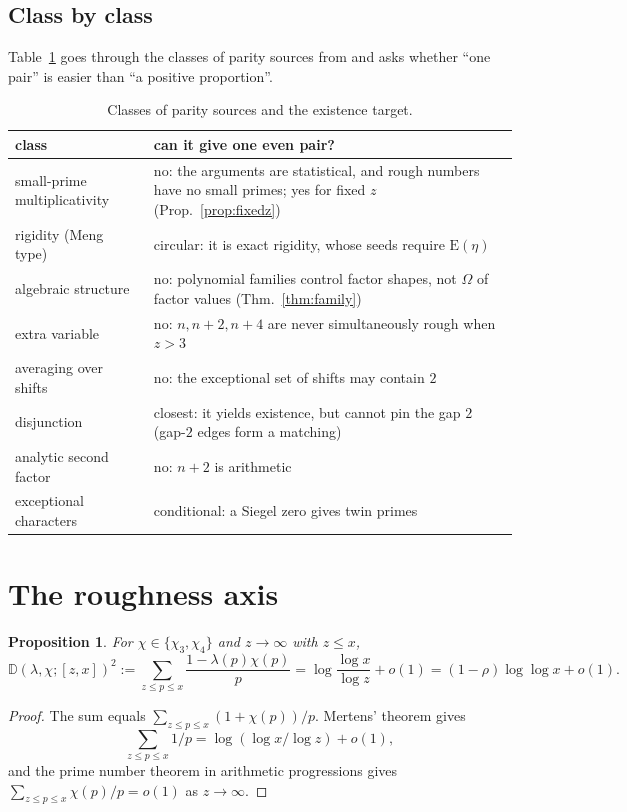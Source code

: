 \documentclass[11pt]{amsart}
\newtheorem{proposition}[theorem]{Proposition}
\theoremstyle{definition}
\theoremstyle{remark}
\newcommand{\D}{\mathbb{D}}
\newcommand{\EE}{\mathrm E}
\begin{document}
\subsection{Class by class}
Table~\ref{tab:classes} goes through the classes of parity sources from \cite{Wan26b} and asks whether ``one pair'' is easier than ``a positive proportion''.

\begin{table}[h]
\centering\small
\begin{tabular}{p{3.4cm}p{9.4cm}}
\toprule
class & can it give one even pair?\\
\midrule
small-prime multiplicativity & no: the arguments are statistical, and rough numbers have no small primes; yes for fixed $z$ (Prop.~\ref{prop:fixedz})\\
rigidity (Meng type) & circular: it is exact rigidity, whose seeds require $\EE(\eta)$\\
algebraic structure & no: polynomial families control factor shapes, not $\Omega$ of factor values (Thm.~\ref{thm:family})\\
extra variable & no: $n,n+2,n+4$ are never simultaneously rough when $z>3$\\
averaging over shifts & no: the exceptional set of shifts may contain $2$\\
disjunction & closest: it yields existence, but cannot pin the gap $2$ (gap-$2$ edges form a matching)\\
analytic second factor & no: $n+2$ is arithmetic\\
exceptional characters & conditional: a Siegel zero gives twin primes \cite{HB83}\\
\bottomrule
\end{tabular}
\caption{Classes of parity sources and the existence target.}\label{tab:classes}
\end{table}

\section{The roughness axis}\label{sec:rough}

\begin{proposition}\label{prop:distance}
For $\chi\in\{\chi_3,\chi_4\}$ and $z\to\infty$ with $z\le x$,
\[
\D(\lambda,\chi;[z,x])^2:=\sum_{z\le p\le x}\frac{1-\lambda(p)\chi(p)}{p}=\log\frac{\log x}{\log z}+o(1)=(1-\rho)\log\log x+o(1).
\]
\end{proposition}
\begin{proof}
The sum equals $\sum_{z\le p\le x}(1+\chi(p))/p$. Mertens' theorem gives
\[\textstyle\sum_{z\le p\le x}1/p=\log(\log x/\log z)+o(1),\]
and the prime number theorem in arithmetic progressions gives $\sum_{z\le p\le x}\chi(p)/p=o(1)$ as $z\to\infty$.
\end{proof}
\end{document}

